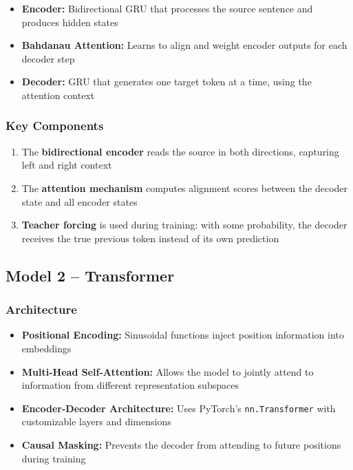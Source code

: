 \documentclass[12pt,a4paper,oneside]{report}
\providecommand{\tightlist}{\setlength{\itemsep}{0pt}\setlength{\parskip}{0pt}}
\begin{document}
\begin{itemize}
\tightlist
\item
  \textbf{Encoder:} Bidirectional GRU that processes the source sentence and produces hidden states
\item
  \textbf{Bahdanau Attention:} Learns to align and weight encoder outputs for each decoder step
\item
  \textbf{Decoder:} GRU that generates one target token at a time, using the attention context
\end{itemize}

\hypertarget{key-components}{%
\subsubsection{Key Components}\label{key-components}}

\begin{enumerate}
\def\labelenumi{\arabic{enumi}.}
\tightlist
\item
  The \textbf{bidirectional encoder} reads the source in both directions, capturing left and right context
\item
  The \textbf{attention mechanism} computes alignment scores between the decoder state and all encoder states
\item
  \textbf{Teacher forcing} is used during training: with some probability, the decoder receives the true previous token instead of its own prediction
\end{enumerate}

\hypertarget{model-2-transformer}{%
\subsection{Model 2 -- Transformer}\label{model-2-transformer}}

\hypertarget{architecture-1}{%
\subsubsection{Architecture}\label{architecture-1}}

\begin{itemize}
\tightlist
\item
  \textbf{Positional Encoding:} Sinusoidal functions inject position information into embeddings
\item
  \textbf{Multi-Head Self-Attention:} Allows the model to jointly attend to information from different representation subspaces
\item
  \textbf{Encoder-Decoder Architecture:} Uses PyTorch's \texttt{nn.Transformer} with customizable layers and dimensions
\item
  \textbf{Causal Masking:} Prevents the decoder from attending to future positions during training
\end{itemize}
\end{document}
